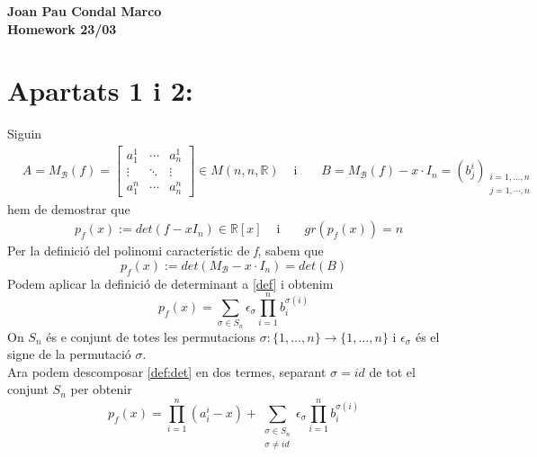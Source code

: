 \documentclass[a4paper, 11pt]{article}
\newcommand{\R}{\mathbb{R}}
\begin{document}
    \begin{center}
        \Large
        \textbf{Joan Pau Condal Marco\\Homework 23/03\\}
        \normalsize
    \end{center}

    \section*{Apartats 1 i 2:}
    Siguin
    \begin{align*}
        &A = M_\mathcal{B}(f) = 
        \begin{bmatrix}
            a_1^1 & \cdots & a^1_n\\
            \vdots & \ddots & \vdots\\
            a^n_1 & \cdots & a^n_n    
        \end{bmatrix} \in M(n,n,\R)
        &\text{ i }&
        &B = M_\mathcal{B}(f) - x\cdot I_n = (b^i_j)_{\substack{i = 1,\dots,n\\j = 1,\cdots,n}}
    \end{align*}
    hem de demostrar que
    \begin{align*}
        &p_f(x) := det(f-xI_n) \in \R[x] &\text{ i }& &gr(p_f(x)) = n
    \end{align*}
    Per la definici\'o del polinomi caracter\'istic de \emph{f}, sabem que
    \begin{equation}
        \label{def}
        p_f(x) := det(M_\mathcal{B} - x\cdot I_n) = det(B)
    \end{equation}
    Podem aplicar la definici\'o de determinant a \eqref{def} i obtenim
    \begin{equation}
        \label{def:det}
        p_f(x) = \sum_{\sigma\in S_n}\epsilon_\sigma \prod_{i=1}^n b_i^{\sigma(i)}
    \end{equation}
    On $S_n$ \'es e conjunt de totes les permutacions $\sigma : \{1,\dots,n\} \longrightarrow \{1,\dots,n\}$ i $\epsilon_\sigma$ \'es el signe de la permutaci\'o $\sigma$.\\
    Ara podem descomposar \eqref{def:det} en dos termes, separant $\sigma = id$ de tot el conjunt $S_n$ per obtenir
    \begin{equation}
        \label{def:desc}
        p_f(x) = \prod_{i=1}^n (a^i_i -x) + \sum_{\substack{\sigma \in S_n\\ \sigma \neq id}} \epsilon_\sigma \prod_{i=1}^n b_i^{\sigma(i)}
    \end{equation}
\end{document}
